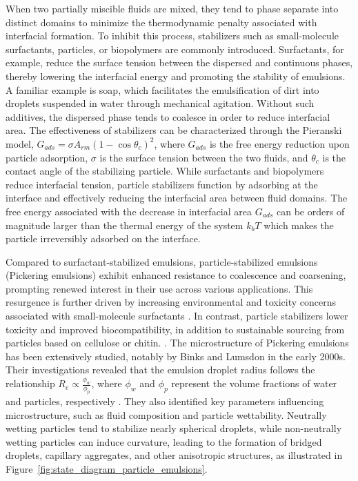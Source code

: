 When two partially miscible fluids are mixed, they tend to phase separate into distinct domains to minimize the thermodynamic penalty associated with interfacial formation. 
To inhibit this process, stabilizers such as small-molecule surfactants, particles, or biopolymers are commonly introduced. Surfactants, for example, reduce the surface tension 
between the dispersed and continuous phases, thereby lowering the interfacial energy and promoting the stability of emulsions. A familiar example is soap, which facilitates the 
emulsification of dirt into droplets suspended in water through mechanical agitation.
Without such additives, the dispersed phase tends to coalesce in order to reduce interfacial area. The effectiveness of stabilizers can be characterized through the Pieranski 
model, $G_{ads} = \sigma A_{rm} (1 - \cos{\theta_c})^2$, where $G_{ads}$ is the free energy reduction upon particle adsorption, $\sigma$ is the surface tension between the two 
fluids, and $\theta_c$ is the contact angle of the stabilizing particle. While surfactants and biopolymers reduce interfacial tension, particle stabilizers function by adsorbing 
at the interface and effectively reducing the interfacial area between fluid domains. The free energy associated with the decrease in interfacial area $G_{ads}$ can be orders of magnitude
larger than the thermal energy of the system $k_b T$ which makes the particle irreversibly adsorbed on the interface. \cite{ngai_particle-stabilized_2015}

Compared to surfactant-stabilized emulsions, particle-stabilized emulsions (Pickering emulsions) exhibit enhanced resistance to coalescence and coarsening, prompting renewed interest 
in their use across various applications. \cite{ngai_particle-stabilized_2015} 
This resurgence is further driven by increasing environmental and toxicity concerns associated with small-molecule surfactants 
\cite{kaczerewska_environmental_2020, lechuga_acute_2016}. In contrast, particle stabilizers lower toxicity and improved biocompatibility, in addition to 
sustainable sourcing from particles based on cellulose or chitin. \cite{fujisawa_nanocellulose-stabilized_2017, tang_stimuli-responsive_2016, kalliola_carboxymethyl_2018}.
The microstructure of Pickering emulsions has been extensively studied, notably by Binks and Lumsdon in the early 2000s. Their investigations revealed that the emulsion droplet radius 
follows the relationship $R_e \propto \frac{\phi_w}{\phi_p}$, where $\phi_w$ and $\phi_p$ represent the volume fractions of water and particles, respectively \cite{binks_pickering_2001}. 
They also identified key parameters influencing microstructure, such as fluid composition and particle wettability. Neutrally wetting particles tend to stabilize nearly spherical droplets, 
while non-neutrally wetting particles can induce curvature, leading to the formation of bridged droplets, capillary aggregates, and other anisotropic structures, as illustrated in 
Figure~\ref{fig:state_diagram_particle_emulsions}.

